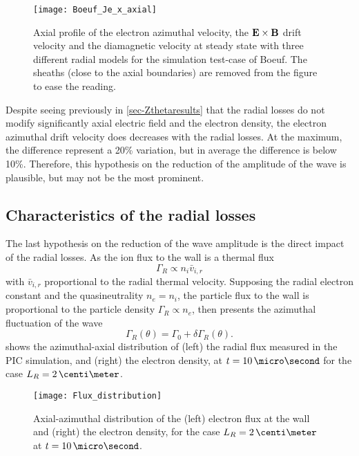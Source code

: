    
  \begin{figure}[hbt]
    \centering
    \texttt{[image: Boeuf\_Je\_x\_axial]}
    \caption{Axial profile of the electron azimuthal velocity, the ${\mathbf E} \times {\mathbf B}$ drift velocity and the diamagnetic velocity at steady state with three different radial models for the simulation test-case of Boeuf. The sheaths (close to the axial boundaries) are removed from the figure to ease the reading.}
    \label{fig-Jetheta}
  \end{figure}

  Despite seeing previously in \cref{sec-Zthetaresults} that the radial losses do not modify significantly axial electric field and the electron density, the electron azimuthal drift velocity does decreases with the radial losses. 
  At the maximum, the difference represent a 20\% variation, but in average the difference is below 10\%.
  Therefore, this hypothesis on the reduction of the amplitude of the wave is plausible, but may not be the most prominent.

\FloatBarrier


\subsection{Characteristics of the radial losses}

  The last hypothesis on the reduction of the wave amplitude is the direct impact of the radial losses.
  As the ion flux to the wall is a thermal flux
  \[ \Gamma_R \propto n_i \bar{v}_{i, r} \]
  with $\bar{v}_{i, r}$ proportional to the radial thermal velocity.
  Supposing the radial electron constant and the quasineutrality $n_e=n_i$, the particle flux to the wall is proportional to the particle density $\Gamma_R \propto n_e$, then presents the azimuthal fluctuation of the wave
  \[ \Gamma_R(\theta) = \Gamma_0 + \delta \Gamma_R(\theta). \]
   shows the azimuthal-axial distribution of (left) the radial flux measured in the \ac{PIC} simulation, and (right) the electron density, at $t=10\,\micro\second$ for the case $L_R=2\,\centi\meter$.

  \begin{figure}[hbtp]
    \centering
    \texttt{[image: Flux\_distribution]}
    \caption{Axial-azimuthal distribution of the (left) electron flux at the wall and (right) the electron density, for the case $L_R=2\,\centi\meter$ at $t=10\,\micro\second$.}
    \label{fig-rfluxs}
  \end{figure}


